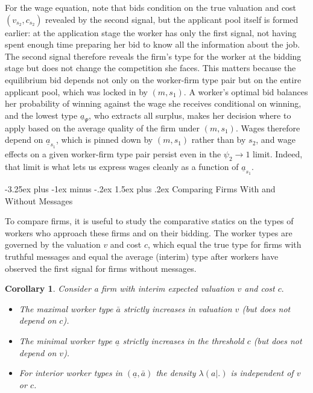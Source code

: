 \documentclass[12pt]{article}
\makeatletter
\renewcommand{\subsection}{%
  \@startsection{subsection}{2}{\z@}%
  {-3.25ex plus -1ex minus -.2ex}%
  {1.5ex plus .2ex}%
  {\normalfont\large\bfseries}%
}
\newtheorem{corollary}[theorem]{Corollary}
\makeatother
\begin{document}
For the wage equation, note that bids condition on the true valuation and cost $(v_{s_{2}},c_{s_{2}})$ revealed by the second signal, but the applicant pool itself is formed earlier: at the application stage the worker has only the first signal, not having spent enough time preparing her bid to know all the information about the job. The second signal therefore reveals the firm's type for the worker at the bidding stage but does not change the competition she faces. This matters because the equilibrium bid depends not only on the worker-firm type pair but on the entire applicant pool, which was locked in by $(m,s_{1})$. A worker's optimal bid balances her probability of winning against the wage she receives conditional on winning, and the lowest type $\underline{a}_{\Psi}$, who extracts all surplus, makes her decision where to apply based on the average quality of the firm under $(m,s_{1})$. Wages therefore depend on $\underline{a}_{s_{1}}$, which is pinned down by $(m,s_{1})$ rather than by $s_{2}$, and wage effects on a given worker-firm type pair persist even in the $\psi_{2}\to 1$ limit. Indeed, that limit is what lets us express wages cleanly as a function of $\underline{a}_{s_{1}}$.



\subsection{Comparing Firms With and Without Messages}\label{sec:comparing}

To compare firms, it is useful to study the comparative statics on the types of workers who approach these firms and on their bidding. The worker types are governed by the valuation $v$ and cost $c$, which equal the true type for firms with truthful messages and equal the average (interim) type after workers have observed the first signal for firms without messages.

\begin{corollary}
\label{corollary}Consider a firm with interim expected valuation $v$ and cost 
$c.$

\begin{itemize}
\item The maximal worker type $\bar{a}$ strictly increases in valuation $v$
(but does not depend on $c$).

\item The minimal worker type $\underline{a}$ strictly increases in the
threshold $c$ (but does not depend on $v$).

\item For interior worker types in $(\underline{a}, \bar{a})$ the density $\lambda (a|.)$ is independent of $v$ or $c$.
\end{itemize}
\end{corollary}
\end{document}
